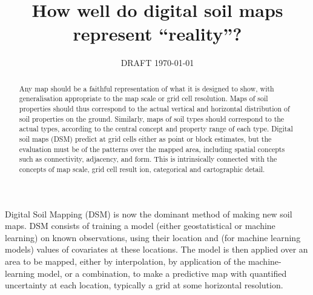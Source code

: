 \documentclass[soil, manuscript]{copernicus}
\begin{document}
\title{How well do digital soil maps represent ``reality''?}





\date{DRAFT \today}



\received{}
\pubdiscuss{} %
\revised{}
\accepted{}
\published{}



\maketitle
\tableofcontents

\newpage
\begin{abstract}
Any map should be a faithful representation of what it is designed to show, with generalisation appropriate to the map scale or grid cell resolution.
%
Maps of soil properties should thus correspond to the actual vertical and horizontal distribution of soil properties on the ground.
%
Similarly, maps of soil types should correspond to the actual types, according to the central concept and property range of each type.
%
Digital soil maps (DSM) predict at grid cells either as point or block estimates, but the evaluation must be of the patterns over the mapped area, including spatial concepts such as connectivity, adjacency, and form.
%
This is intrinsically connected with the concepts of map scale, grid cell result ion, categorical and cartographic detail.
\end{abstract}

\newpage
\introduction  %

\par
Digital Soil Mapping (DSM) is now the dominant method of making new soil maps.
%
DSM consists of training a model (either geostatistical or machine learning) on known observations, using their location and (for machine learning models) values of covariates at these locations.
%
The model is then applied over an area to be mapped, either by interpolation, by application of the machine-learning model, or a combination, to make a predictive map with quantified uncertainty at each location, typically a grid at some horizontal resolution.
\end{document}
